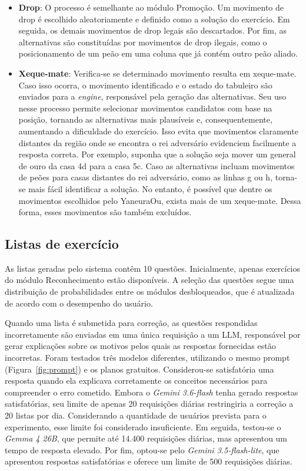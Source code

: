 \begin{itemize}
        \item \textbf{Drop}: O processo é semelhante ao módulo Promoção. Um movimento de drop é escolhido aleatoriamente e definido como a solução do exercício. Em seguida, os demais movimentos de drop legais são descartados. Por fim, as alternativas são constituídas por movimentos de drop ilegais, como o posicionamento de um peão em uma coluna que já contém outro peão aliado.
        \item \textbf{Xeque-mate}: Verifica-se se determinado movimento resulta em xeque-mate. Caso isso ocorra, o movimento identificado e o estado do tabuleiro são enviados para a \textit{engine}, responsável pela geração das alternativas. Seu uso nesse processo permite selecionar movimentos candidatos com base na posição, tornando as alternativas mais plausíveis e, consequentemente, aumentando a dificuldade do exercício. Isso evita que movimentos claramente distantes da região onde se encontra o rei adversário evidenciem facilmente a resposta correta. Por exemplo, suponha que a solução seja mover um general de ouro da casa 4d para a casa 5c. Caso as alternativas incluam movimentos de peões para casas distantes do rei adversário, como as linhas g ou h, torna-se mais fácil identificar a solução. No entanto, é possível que dentre os movimentos escolhidos pelo YaneuraOu, exista mais de um xeque-mate. Dessa forma, esses movimentos são também excluídos.
        
    \end{itemize}

    \subsection{Listas de exercício}
    \label{sec:exercise_list}    
     As listas geradas pelo sistema contêm 10 questões. Inicialmente, apenas exercícios do módulo Reconhecimento estão disponíveis. A seleção das questões segue uma distribuição de probabilidades entre os módulos desbloqueados, que é atualizada de acordo com o desempenho do usuário.


    Quando uma lista é submetida para correção, as questões respondidas incorretamente são enviadas em uma única requisição a um LLM, responsável por gerar explicações sobre os motivos pelos quais as respostas fornecidas estão incorretas. Foram testados três modelos diferentes, utilizando o mesmo prompt (Figura~\ref{fig:prompt}) e os planos gratuitos. Considerou-se satisfatória uma resposta quando ela explicava corretamente os conceitos necessários para compreender o erro cometido. Embora o \textit{Gemini 3.6-flash} tenha gerado respostas satisfatórias, seu limite de apenas 20 requisições diárias restringiria a correção a 20 listas por dia. Considerando a quantidade de usuários prevista para o experimento, esse limite foi considerado insuficiente. Em seguida, testou-se o \textit{Gemma 4 26B}, que permite até 14.400 requisições diárias, mas apresentou um tempo de resposta elevado. Por fim, optou-se pelo \textit{Gemini 3.5-flash-lite}, que apresentou respostas satisfatórias e oferece um limite de 500 requisições diárias.

